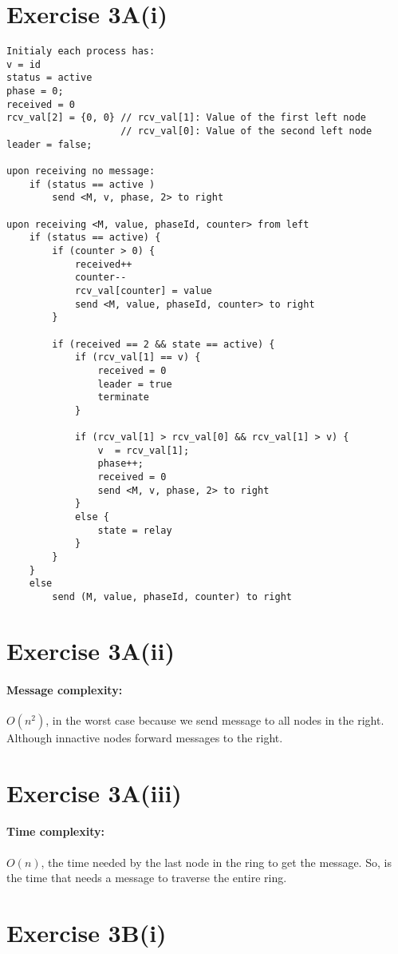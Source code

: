 \section*{Exercise 3A(i)}

\begin{lstlisting}[style=mycode]
Initialy each process has:
v = id
status = active
phase = 0;
received = 0
rcv_val[2] = {0, 0} // rcv_val[1]: Value of the first left node 
					// rcv_val[0]: Value of the second left node
leader = false;

upon receiving no message:
	if (status == active )
		send <M, v, phase, 2> to right

upon receiving <M, value, phaseId, counter> from left
	if (status == active) {
		if (counter > 0) {
			received++
			counter--
			rcv_val[counter] = value
			send <M, value, phaseId, counter> to right
		}

		if (received == 2 && state == active) {
			if (rcv_val[1] == v) {
				received = 0
				leader = true
				terminate
			}

			if (rcv_val[1] > rcv_val[0] && rcv_val[1] > v) {
				v  = rcv_val[1];
				phase++;
				received = 0
				send <M, v, phase, 2> to right
			}
			else {
				state = relay 
			}
		}
	}
	else
		send (M, value, phaseId, counter) to right
\end{lstlisting}

\section*{Exercise 3A(ii)}
\paragraph{Message complexity:} $O(n^2)$, in the worst case because we
send message to all nodes in the right. Although innactive nodes
forward messages to the right.

\section*{Exercise 3A(iii)}
\paragraph{Time complexity:} $O(n)$, the time needed by the last node
in the ring to get the message. So, is the time that needs a message
to traverse the entire ring. 

\section*{Exercise 3B(i)}

